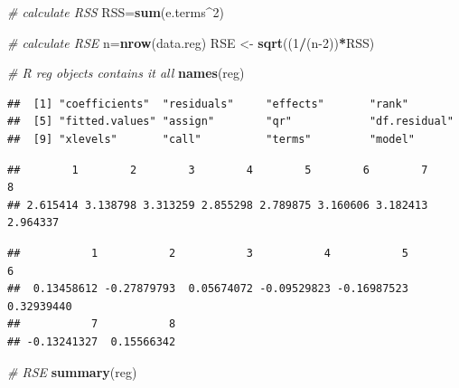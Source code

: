 \documentclass[]{article}
\newenvironment{Shaded}{\begin{snugshade}}{\end{snugshade}}
\newcommand{\CommentTok}[1]{\textcolor[rgb]{0.56,0.35,0.01}{\textit{#1}}}
\newcommand{\DecValTok}[1]{\textcolor[rgb]{0.00,0.00,0.81}{#1}}
\newcommand{\KeywordTok}[1]{\textcolor[rgb]{0.13,0.29,0.53}{\textbf{#1}}}
\newcommand{\NormalTok}[1]{#1}
\newcommand{\OperatorTok}[1]{\textcolor[rgb]{0.81,0.36,0.00}{\textbf{#1}}}
\newcommand{\StringTok}[1]{\textcolor[rgb]{0.31,0.60,0.02}{#1}}
\begin{document}
\begin{Shaded}
\begin{Highlighting}[]
\CommentTok{# calculate RSS}
\NormalTok{RSS=}\KeywordTok{sum}\NormalTok{(e.terms}\OperatorTok{^}\DecValTok{2}\NormalTok{)}

\CommentTok{# calculate RSE}
\NormalTok{n=}\KeywordTok{nrow}\NormalTok{(data.reg)}
\NormalTok{RSE <-}\StringTok{ }\KeywordTok{sqrt}\NormalTok{((}\DecValTok{1}\OperatorTok{/}\NormalTok{(n}\DecValTok{-2}\NormalTok{))}\OperatorTok{*}\NormalTok{RSS)}

\CommentTok{# R reg objects contains it all}
\KeywordTok{names}\NormalTok{(reg)}
\end{Highlighting}
\end{Shaded}

\begin{verbatim}
##  [1] "coefficients"  "residuals"     "effects"       "rank"         
##  [5] "fitted.values" "assign"        "qr"            "df.residual"  
##  [9] "xlevels"       "call"          "terms"         "model"
\end{verbatim}

\begin{Shaded}
\end{Shaded}

\begin{verbatim}
##        1        2        3        4        5        6        7        8 
## 2.615414 3.138798 3.313259 2.855298 2.789875 3.160606 3.182413 2.964337
\end{verbatim}

\begin{Shaded}
\end{Shaded}

\begin{verbatim}
##           1           2           3           4           5           6 
##  0.13458612 -0.27879793  0.05674072 -0.09529823 -0.16987523  0.32939440 
##           7           8 
## -0.13241327  0.15566342
\end{verbatim}

\begin{Shaded}
\begin{Highlighting}[]
\CommentTok{# RSE}
\KeywordTok{summary}\NormalTok{(reg)}
\end{Highlighting}
\end{Shaded}
\end{document}
